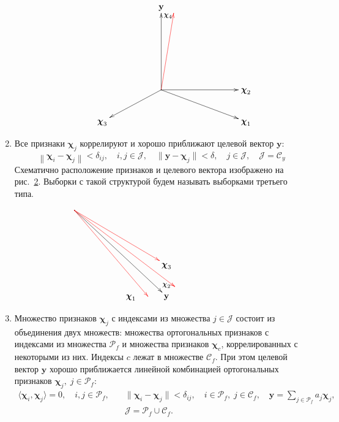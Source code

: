 \documentclass[a4paper,12pt]{article}
\newcommand{\by}{\mathbf{y}}
\newcommand{\bchi}{\boldsymbol{\chi}}
\newcommand{\calC}{\mathcal{C}}
\newcommand{\calP}{\mathcal{P}}
\newcommand{\calJ}{\mathcal{J}}
\theoremstyle{plain}
\begin{document}
\begin{enumerate}
\begin{figure}[!h]
\begin{equation*}
\xymatrix{
& & & \by & & & \\
& & &     & & & \\
& & &     & & & \\
& & & *=0{.}\ar[uuu]_>>{\large \bchi_4} %
\ar@[red][uuu]!/va(70) 80pt/ %
\ar[rrrd] %
\ar[rrr] %
\ar[lld] & & & \bchi_2 \\
& \bchi_3 & & & & & \bchi_1
}
\end{equation*}
\caption{}
\label{fig:random}
\end{figure}
%

\item Все признаки $\bchi_j$ коррелируют и хорошо приближают целевой вектор $\by$:
\begin{equation}
\left \| \bchi_i - \bchi_j \right \| < \delta_{ij}, \quad i, j \in \calJ, \quad \| \by - \bchi_j \| < \delta, \quad j \in \calJ, \quad \calJ = \calC_y 
\label{eq:col}
\end{equation}
Схематично расположение признаков и целевого вектора изображено на рис.~\ref{fig:col}. Выборки с такой структурой будем называть выборками третьего типа.  

\begin{figure}[!h]
\begin{equation*}
\xymatrix{
*=0{.}\ar[rrrddd]^>>{\large \bchi_2} %
\ar@[red][rrrdd] %
\ar@[red][dddrr]+/va(0) 20pt/ %
\ar@[red][rrrddd]+/va(50) 15pt/& & & \\
& & & & & & \\
& & & \bchi_3  \\
& & \bchi_1 &  \by 
}
\end{equation*}
\caption{}
\label{fig:col}
\end{figure}

%

\item Множество признаков $\bchi_j$ с индексами из множества $j \in \calJ$ состоит из объединения двух множеств: множества ортогональных признаков с индексами из множества $\calP_f$ и множества признаков $\bchi_c$, коррелированных с некоторыми из них. Индексы $c$ лежат в множестве $\calC_f$. При этом целевой вектор $\by$ хорошо приближается линейной комбинацией ортогональных признаков $\bchi_j, \; j \in \calP_f$:
\begin{equation}
\begin{split}
\langle \bchi_i, \bchi_j \rangle = 0, \quad i, j \in \calP_f, \quad & \| \bchi_i - \bchi_j \| < \delta_{ij}, \quad i \in \calP_f, \; j \in \calC_f, \quad \by = \sum\limits_{j \in \calP_f} a_j\bchi_j, \\ 
& \calJ = \calP_f \cup \calC_f.
\end{split}
\label{eq:sumort}
\end{equation}


\end{enumerate}
\end{document}
